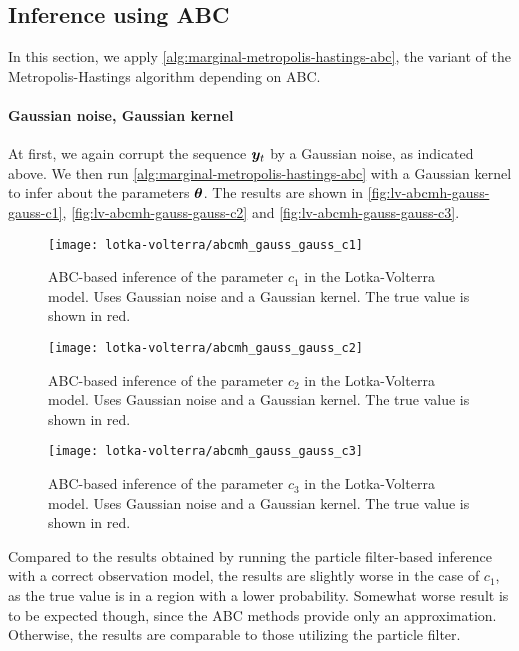 \subsection{Inference using ABC}
In this section, we apply \autoref{alg:marginal-metropolis-hastings-abc}, the variant of the Metropolis-Hastings algorithm depending on ABC.

\paragraph{Gaussian noise, Gaussian kernel}
At first, we again corrupt the sequence $\bm{y}_t$ by a Gaussian noise, as indicated above. We then run \autoref{alg:marginal-metropolis-hastings-abc} with a Gaussian kernel to infer about the parameters $\bm{\theta}$. The results are shown in \autoref{fig:lv-abcmh-gauss-gauss-c1}, \autoref{fig:lv-abcmh-gauss-gauss-c2} and \autoref{fig:lv-abcmh-gauss-gauss-c3}.

\begin{figure}[ht]
    \centering
    \texttt{[image: lotka-volterra/abcmh\_gauss\_gauss\_c1]}
    \caption{ABC-based inference of the parameter $c_1$ in the Lotka-Volterra model. Uses Gaussian noise and a Gaussian kernel. The true value is shown in red.}
    \label{fig:lv-abcmh-gauss-gauss-c1}
\end{figure}

\begin{figure}[ht]
    \centering
    \texttt{[image: lotka-volterra/abcmh\_gauss\_gauss\_c2]}
    \caption{ABC-based inference of the parameter $c_2$ in the Lotka-Volterra model. Uses Gaussian noise and a Gaussian kernel. The true value is shown in red.}
    \label{fig:lv-abcmh-gauss-gauss-c2}
\end{figure}

\begin{figure}[ht]
    \centering
    \texttt{[image: lotka-volterra/abcmh\_gauss\_gauss\_c3]}
    \caption{ABC-based inference of the parameter $c_3$ in the Lotka-Volterra model. Uses Gaussian noise and a Gaussian kernel. The true value is shown in red.}
    \label{fig:lv-abcmh-gauss-gauss-c3}
\end{figure}

Compared to the results obtained by running the particle filter-based inference with a correct observation model, the results are slightly worse in the case of $c_1$, as the true value is in a region with a lower probability. Somewhat worse result is to be expected though, since the ABC methods provide only an approximation. Otherwise, the results are comparable to those utilizing the particle filter.


